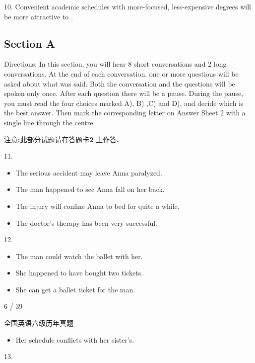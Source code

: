 \documentclass[UTF8,11pt]{ctexart}
\begin{document}
10. Convenient academic schedules with more-focused, less-expensive degrees will be more attractive to .


\subsection*{\textbf{Section A}}


Directions: In this section, you will hear 8 short conversations and 2 long conversations. At the end of each conversation, one or more questions will be asked about what was said. Both the conversation and the questions will be spoken only once. After each question there will be a pause. During the pause, you must read the four choices marked A), B) ,C) and D), and decide which is the best answer. Then mark the corresponding letter on Answer Sheet 2 with a single line through the centre.


注意\textbf{:}此部分试题请在答题卡\textbf{2} 上作答\textbf{.}


11.


\begin{itemize}[leftmargin=2em,itemsep=.2em,topsep=.4em]\item[A.] The serious accident may leave Anna paralyzed.
\item[B.] The man happened to see Anna fall on her back.
\item[C.] The injury will confine Anna to bed for quite a while.
\item[D.] The doctor’s therapy has been very successful.
\end{itemize}

12.


\begin{itemize}[leftmargin=2em,itemsep=.2em,topsep=.4em]\item[A.] The man could watch the ballet with her.
\item[B.] She happened to have bought two tickets.
\item[C.] She can get a ballet ticket for the man.
\end{itemize}

6 / 39


全国英语六级历年真题


\begin{itemize}[leftmargin=2em,itemsep=.2em,topsep=.4em]\item[D.] Her schedule conflicts with her sister’s.
\end{itemize}

13.
\end{document}
